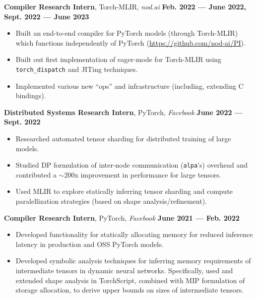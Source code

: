 \documentclass[11pt,letterpaper,roman,colorlinks,linkcolor=blue]{moderncv}
\begin{document}
\textbf{Compiler Research Intern}, Torch-MLIR, \emph{nod.ai}
\hfill \textbf{Feb. 2022 --- June 2022, Sept. 2022 --- June 2023}
\begin{itemize}
\item Built an end-to-end compiler for PyTorch models (through Torch-MLIR) which functions independently of PyTorch (\href{https://github.com/nod-ai/PI}{https://github.com/nod-ai/PI}).
\item Built out first implementation of eager-mode for Torch-MLIR using \texttt{torch\_dispatch} and JITing techniques.
\item Implemented various new ``ops'' and infrastructure (including, extending C bindings).
\end{itemize}

\textbf{Distributed Systems Research Intern}, PyTorch, \emph{Facebook}
\hfill \textbf{June 2022 --- Sept. 2022}
\begin{itemize}
\item Researched automated tensor sharding for distributed training of large models.
\item Studied DP formulation of inter-node communication (\texttt{alpa}'s) overhead and contributed a $\sim$200x improvement in performance for large tensors.
\item Used MLIR to explore statically inferring tensor sharding and compute paralellization strategies (based on shape analysis/refinement).
\end{itemize}

\textbf{Compiler Research Intern}, PyTorch, \emph{Facebook}
\hfill \textbf{June 2021 --- Feb. 2022}
\begin{itemize}
\item Developed functionality for statically allocating memory for reduced inference latency in production and OSS PyTorch models.
\item Developed symbolic analysis techniques for inferring memory requirements of intermediate tensors in dynamic neural networks. Specifically, used and extended shape analysis in TorchScript, combined with MIP formulation of storage allocation, to derive upper bounds on sizes of intermediate tensors.  
\end{itemize}

\end{document}
